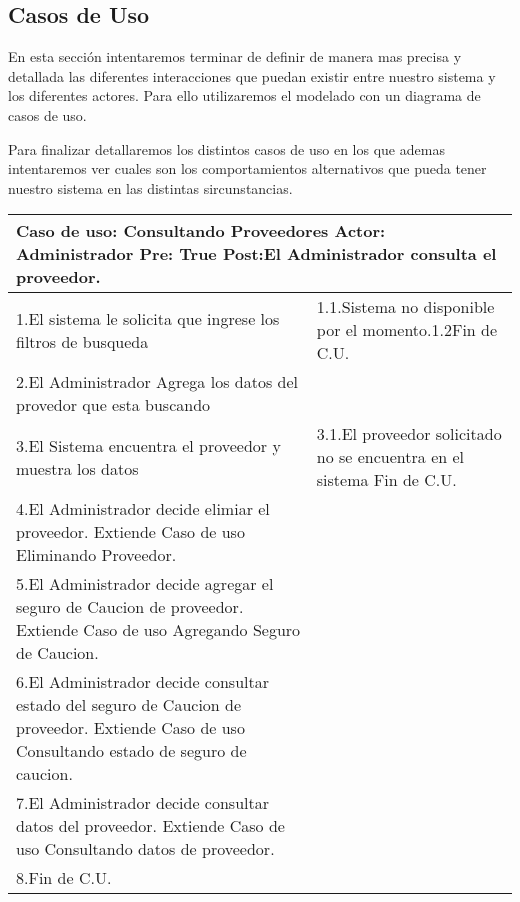 \subsection{Casos de Uso}

En esta sección intentaremos terminar de definir de manera mas precisa y detallada las diferentes interacciones que puedan existir entre nuestro sistema y los diferentes actores. Para ello utilizaremos el modelado con un diagrama de casos de uso.

Para finalizar detallaremos los distintos casos de uso en los que ademas intentaremos ver cuales son los comportamientos alternativos que pueda tener nuestro sistema en las distintas sircunstancias.

\begin{longtable}{| p{} | p{} |} 
    \hline
    \multicolumn{2}{|p{16cm}|}{
        \textbf{Caso de uso:} Consultando Proveedores \newline
        \textbf{Actor:} Administrador\newline
        \textbf{Pre:}  True\newline
        \textbf{Post:}El Administrador consulta el proveedor.
    }\\
    \hline
    1.El sistema le solicita que ingrese los filtros de busqueda  & 1.1.Sistema no  disponible por el momento.\newline 1.2Fin de C.U.\\
    \hline
    2.El Administrador Agrega los datos del provedor que esta buscando& \\
    \hline
    3.El Sistema encuentra el proveedor y muestra los datos & 3.1.El proveedor solicitado no se encuentra en el sistema \newline 3.2 Fin de C.U.  \\
    \hline
    4.El Administrador decide elimiar el proveedor. Extiende Caso de uso Eliminando Proveedor.& \\
    \hline
    5.El Administrador decide agregar el seguro de Caucion de proveedor. Extiende Caso de uso Agregando Seguro de Caucion.& \\
    \hline
    6.El Administrador decide consultar estado del seguro de Caucion de proveedor. Extiende Caso de uso Consultando estado de seguro de caucion.& \\
    \hline
    7.El Administrador decide consultar datos del proveedor. Extiende Caso de uso Consultando datos de proveedor.& \\
    \hline
    8.Fin de C.U.& \\
    \hline
\end{longtable}

